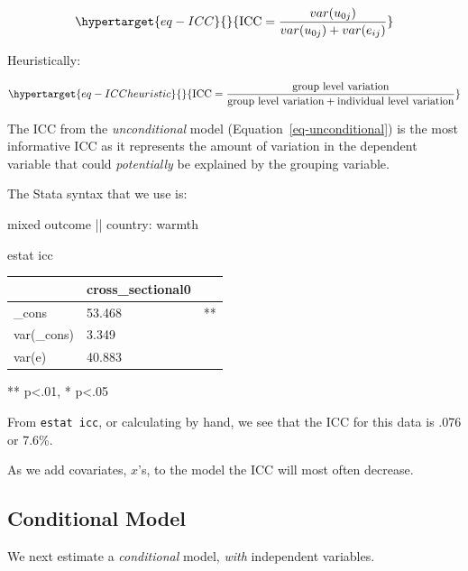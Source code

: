 \documentclass[
  letterpaper,
  DIV=11,
  numbers=noendperiod]{scrreprt}
\newenvironment{Shaded}{\begin{snugshade}}{\end{snugshade}}
\newcommand{\KeywordTok}[1]{\textcolor[rgb]{0.00,0.23,0.31}{#1}}
\newcommand{\NormalTok}[1]{\textcolor[rgb]{0.00,0.23,0.31}{#1}}
\begin{document}
\begin{equation}\protect\hypertarget{eq-ICC}{}{\text{ICC} = \frac{var(u_{0j})}{var(u_{0j}) + var(e_{ij})}}\label{eq-ICC}\end{equation}

Heuristically:

\begin{equation}\protect\hypertarget{eq-ICCheuristic}{}{\text{ICC} = \frac{\text{group level variation}}{\text{group level variation} + \text{individual level variation}}}\label{eq-ICCheuristic}\end{equation}

The ICC from the \emph{unconditional} model
(Equation~\ref{eq-unconditional}) is the most informative ICC as it
represents the amount of variation in the dependent variable that could
\emph{potentially} be explained by the grouping variable.

The Stata syntax that we use is:

\begin{Shaded}
\begin{Highlighting}[]

\NormalTok{mixed outcome || country: warmth}

\KeywordTok{estat}\NormalTok{ icc}
\end{Highlighting}
\end{Shaded}

\begin{longtable}[]{@{}lll@{}}
\toprule()
& cross\_sectional0 & \\
\midrule()
\endhead
\_cons & 53.468 & ** \\
var(\_cons) & 3.349 & \\
var(e) & 40.883 & \\
\bottomrule()
\end{longtable}

** p\textless.01, * p\textless.05

From \texttt{estat\ icc}, or calculating by hand, we see that the ICC
for this data is .076 or 7.6\%.

As we add covariates, \(x\)'s, to the model the ICC will most often
decrease.

\hypertarget{conditional-model}{%
\subsection{Conditional Model}\label{conditional-model}}

We next estimate a \emph{conditional} model, \emph{with} independent
variables.
\end{document}
